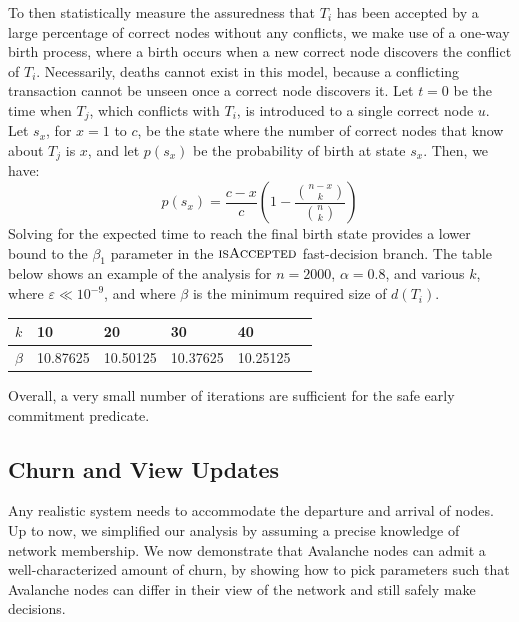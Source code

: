 \documentclass[letterpaper,twocolumn,10pt]{article}
\newcommand{\tronly}[2]{#1}
\theoremstyle{definition}
\begin{document}
\begin{appendices}
To then statistically measure the assuredness that $T_i$ has been accepted by a large percentage of correct nodes without any conflicts, we make use of a one-way birth process, where a birth occurs when a new correct node discovers the conflict of $T_i$. \tronly{Necessarily, deaths cannot exist in this model, because a conflicting transaction cannot be unseen once a correct node discovers it. Let $t = 0$ be the time when $T_j$, which conflicts with $T_i$, is introduced to a single correct node $u$.
Let $s_x$, for $x = 1$ to $c$, be the state where the number of correct nodes that know about $T_j$ is $x$, and let $p(s_x)$ be the probability of birth at state $s_x$. Then, we have:
\begin{equation}
    p(s_x) = \frac{c - x}{c} \left(1 - \frac{{n - x \choose k}}{{n \choose k}}\right)
\end{equation}
Solving for the expected time to reach the final birth state provides a lower bound to the $\beta_1$ parameter in the $\textsc{isAccepted}$ fast-decision branch.}{We leave details to the tech report.} The table below shows an example of the analysis for $n = 2000$, $\alpha = 0.8$, and various $k$, where $\varepsilon \ll 10^{-9}$, and where $\beta$ is the minimum required size of $d(T_i)$.
\tronly{}{\vspace{-2ex}}
\begin{table}[h!]
    \small
	\centering
	\begin{tabular}{llllll}
		$k$   & 10 & 20 & 30 & 40 \\ \hline
		$\beta$ & 10.87625 & 10.50125 & 10.37625 & 10.25125
	\end{tabular}
	\label{table:fast-path-beta}
\end{table}
\tronly{}{\vspace{-2ex}}
\noindent Overall, a very small number of iterations are sufficient for the safe early commitment predicate. 

\subsection{Churn and View Updates}\tronly{}{\vspace{-0.5em}}
\tronly{Any realistic system needs to accommodate the departure and arrival of nodes.}{}
Up to now, we simplified our analysis by assuming a precise knowledge of network membership.
We now demonstrate that Avalanche nodes \tronly{can admit a well-characterized amount of churn,
by showing how to pick parameters such that Avalanche nodes}{} can differ in their view of the network and still safely make decisions.


\end{appendices}
\end{document}
